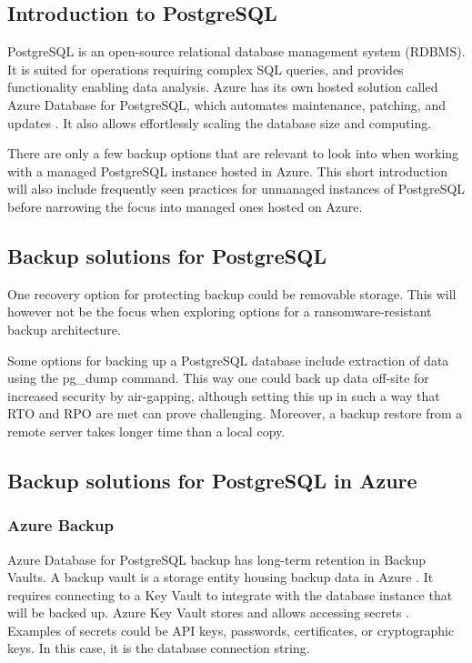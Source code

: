 \subsection{Introduction to PostgreSQL}
PostgreSQL is an open-source relational database management system (RDBMS). It is suited for operations requiring complex SQL queries, and provides functionality enabling data analysis. Azure has its own hosted solution called Azure Database for PostgreSQL, which automates maintenance, patching, and updates \cite{noauthor_azure_nodate}. It also allows effortlessly scaling the database size and computing.

 There are only a few backup options that are relevant to look into when working with a managed PostgreSQL instance hosted in Azure. This short introduction will also include frequently seen practices for unmanaged instances of PostgreSQL before narrowing the focus into managed ones hosted on Azure.


\subsection{Backup solutions for PostgreSQL}

One recovery option for protecting backup could be removable storage.
This will however not be the focus when exploring options for a ransomware-resistant backup architecture.
 
Some options for backing up a PostgreSQL database include extraction of data using the pg{\_}dump command. This way one could back up data off-site for increased security by air-gapping, although setting this up in such a way that RTO and RPO are met can prove challenging. Moreover, a backup restore from a remote server takes longer time than a local copy. 

\subsection{Backup solutions for PostgreSQL in Azure}

\subsubsection{Azure Backup} \label{theory:PITR}
Azure Database for PostgreSQL backup has long-term retention in Backup Vaults. A backup vault is a storage entity housing backup data in Azure \cite{v-amallick_overview_nodate}. It requires connecting to a Key Vault to integrate with the database instance that will be backed up. Azure Key Vault stores and allows accessing secrets \cite{noauthor_key_nodate}. Examples of secrets could be API keys, passwords, certificates, or cryptographic keys. In this case, it is the database connection string.

